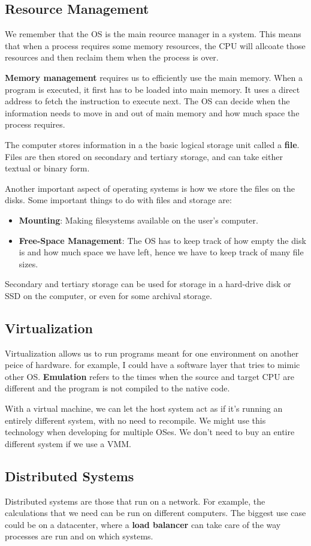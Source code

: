 \documentclass{tufte-handout}
\begin{document}
\subsection{Resource Management}
We remember that the OS is the main reource manager in a system. This means that when
a process requires some memory resources, the CPU will allcoate those resources and then 
reclaim them when the process is over.

\textbf{Memory management} requires us to efficiently use the main memory. When a program
is executed, it first has to be loaded into main memory. It uses a direct address to fetch
the instruction to execute next. The OS can decide when the information needs to move in
and out of main memory and how much space the process requires.

The computer stores information in a the basic logical storage unit called a \textbf{file}.
Files are then stored on secondary and tertiary storage, and can take either textual
or binary form.

Another important aspect of operating systems is how we store the files on the disks.
Some important things to do with files and storage are: 
\begin{itemize}
		\item \textbf{Mounting}: Making filesystems available on the user's computer.
		\item \textbf{Free-Space Management}: The OS has to keep track of how empty the 
				disk is and how much space we have left, hence we have to keep track
				of many file sizes.
\end{itemize}

Secondary and tertiary storage can be used for storage in a hard-drive disk or SSD on the
computer, or even for some archival storage.

\subsection{Virtualization}
Virtualization allows us to run programs meant for one environment on another peice of 
hardware. for example, I could have a software layer that tries to mimic other 
OS. \textbf{Emulation} refers to the times when the source and target CPU are different
and the program is not compiled to the native code. 

With a virtual machine, we can let the host system act as if it's running an entirely 
different system, with no need to recompile. We might use this technology when
developing for multiple OSes. We don't need to buy an entire different system 
if we use a VMM.

\subsection{Distributed Systems}
Distributed systems are those that run on a network. For example, the calculations
that we need can be run on different computers. The biggest use case could be on a 
datacenter, where a \textbf{load balancer} can take care of the way processes are run 
and on which systems.
\end{document}
